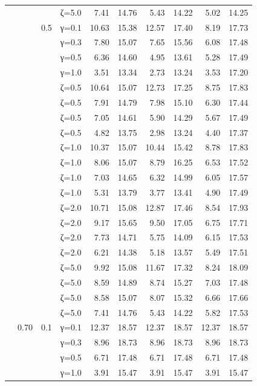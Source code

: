 \begin{table}[htbp]
\begin{tabular}{ll r l  rr  rr  rr}
  &  &  & ζ=5.0 & 7.41 & 14.76 & 5.43 & 14.22 & 5.02 & 14.25 \\
  &  & 0.5 & γ=0.1 & 10.63 & 15.38 & 12.57 & 17.40 & 8.19 & 17.73 \\
  &  &  & γ=0.3 & 7.80 & 15.07 & 7.65 & 15.56 & 6.08 & 17.48 \\
  &  &  & γ=0.5 & 6.36 & 14.60 & 4.95 & 13.61 & 5.28 & 17.49 \\
  &  &  & γ=1.0 & 3.51 & 13.34 & 2.73 & 13.24 & 3.53 & 17.20 \\
  &  &  & ζ=0.5 & 10.64 & 15.07 & 12.73 & 17.25 & 8.75 & 17.83 \\
  &  &  & ζ=0.5 & 7.91 & 14.79 & 7.98 & 15.10 & 6.30 & 17.44 \\
  &  &  & ζ=0.5 & 7.05 & 14.61 & 5.90 & 14.29 & 5.67 & 17.49 \\
  &  &  & ζ=0.5 & 4.82 & 13.75 & 2.98 & 13.24 & 4.40 & 17.37 \\
  &  &  & ζ=1.0 & 10.37 & 15.07 & 10.44 & 15.42 & 8.78 & 17.83 \\
  &  &  & ζ=1.0 & 8.06 & 15.07 & 8.79 & 16.25 & 6.53 & 17.52 \\
  &  &  & ζ=1.0 & 7.03 & 14.65 & 6.32 & 14.99 & 6.05 & 17.57 \\
  &  &  & ζ=1.0 & 5.31 & 13.79 & 3.77 & 13.41 & 4.90 & 17.49 \\
  &  &  & ζ=2.0 & 10.71 & 15.08 & 12.87 & 17.46 & 8.54 & 17.93 \\
  &  &  & ζ=2.0 & 9.17 & 15.65 & 9.50 & 17.05 & 6.75 & 17.71 \\
  &  &  & ζ=2.0 & 7.73 & 14.71 & 5.75 & 14.09 & 6.15 & 17.53 \\
  &  &  & ζ=2.0 & 6.21 & 14.38 & 5.18 & 13.57 & 5.49 & 17.51 \\
  &  &  & ζ=5.0 & 9.92 & 15.08 & 11.67 & 17.32 & 8.24 & 18.09 \\
  &  &  & ζ=5.0 & 8.59 & 14.89 & 8.74 & 15.27 & 7.03 & 17.48 \\
  &  &  & ζ=5.0 & 8.58 & 15.07 & 8.07 & 15.32 & 6.66 & 17.66 \\
  &  &  & ζ=5.0 & 7.41 & 14.76 & 5.43 & 14.22 & 5.82 & 17.53 \\
  & 0.70 & 0.1 & γ=0.1 & 12.37 & 18.57 & 12.37 & 18.57 & 12.37 & 18.57 \\
  &  &  & γ=0.3 & 8.96 & 18.73 & 8.96 & 18.73 & 8.96 & 18.73 \\
  &  &  & γ=0.5 & 6.71 & 17.48 & 6.71 & 17.48 & 6.71 & 17.48 \\
  &  &  & γ=1.0 & 3.91 & 15.47 & 3.91 & 15.47 & 3.91 & 15.47 \\

\end{tabular}
\end{table}
